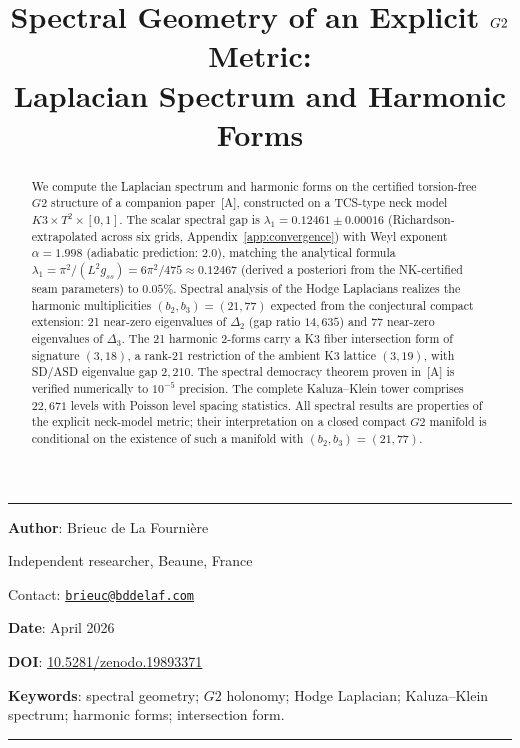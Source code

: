\documentclass[11pt,a4paper]{article}
\title{%
\LARGE\textbf{Spectral Geometry of an Explicit $\Gtwo$ Metric:\\[0.2em]
Laplacian Spectrum and Harmonic Forms}
}
\author{}
\date{}
\newcommand{\Gtwo}{\mathrm{G}_2}
\def\Gtwo{G2}%
\begin{document}
\maketitle
\noindent\rule{\textwidth}{0.2pt}

\noindent\textbf{Author}: Brieuc de La Fourni\`ere

\noindent Independent researcher, Beaune, France

\noindent Contact: \href{mailto:brieuc@bddelaf.com}{\texttt{brieuc@bddelaf.com}}

\noindent\textbf{Date}: April 2026

\noindent\textbf{DOI}: \href{https://doi.org/10.5281/zenodo.19893371}{10.5281/zenodo.19893371}

\vfill

\begin{abstract}
We compute the Laplacian spectrum and harmonic forms on the certified torsion-free $\Gtwo$ structure of a companion paper~[A], constructed on a TCS-type neck model $K3 \times T^2 \times [0,1]$. The scalar spectral gap is $\lambda_1 = 0.12461 \pm 0.00016$ (Richardson-extrapolated across six grids, Appendix~\ref{app:convergence}) with Weyl exponent $\alpha = 1.998$ (adiabatic prediction: $2.0$), matching the analytical formula $\lambda_1 = \pi^2/(L^2 g_{ss}) = 6\pi^2/475 \approx 0.12467$ (derived a posteriori from the NK-certified seam parameters) to $0.05\%$. Spectral analysis of the Hodge Laplacians realizes the harmonic multiplicities $(b_2, b_3) = (21, 77)$ expected from the conjectural compact extension: 21 near-zero eigenvalues of $\Delta_2$ (gap ratio $14{,}635$) and 77 near-zero eigenvalues of $\Delta_3$. The 21 harmonic 2-forms carry a K3 fiber intersection form of signature $(3, 18)$, a rank-21 restriction of the ambient K3 lattice $(3, 19)$, with SD/ASD eigenvalue gap $2{,}210$. The spectral democracy theorem proven in~[A] is verified numerically to $10^{-5}$ precision. The complete Kaluza--Klein tower comprises $22{,}671$ levels with Poisson level spacing statistics. All spectral results are properties of the explicit neck-model metric; their interpretation on a closed compact $\Gtwo$ manifold is conditional on the existence of such a manifold with $(b_2, b_3) = (21, 77)$.
\end{abstract}

\noindent\textbf{Keywords}: spectral geometry; $\Gtwo$ holonomy; Hodge Laplacian; Kaluza--Klein spectrum; harmonic forms; intersection form.

\vfill
\noindent\rule{\textwidth}{0.2pt}
\end{document}
